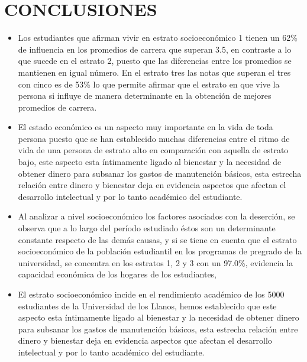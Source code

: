 
\section{CONCLUSIONES}

\begin{itemize}
 	
 	\item Los estudiantes que afirman vivir en estrato socioeconómico 1 tienen un 62\% de influencia en los promedios de carrera que superan 3.5, en contraste a lo que sucede en el estrato 2, puesto que las diferencias entre los promedios se mantienen en igual número. En el estrato tres las notas que superan el tres con cinco es de 53\% lo que permite afirmar que el estrato  en que vive la persona si influye de manera determinante en la obtención de mejores promedios de carrera.
 	
 	\item El estado económico es un aspecto muy importante en la vida de toda persona puesto que se han establecido muchas diferencias entre el ritmo de vida de una persona de estrato alto en comparación con aquella de estrato bajo, este aspecto esta íntimamente ligado al bienestar y la necesidad de obtener dinero para subsanar los gastos de manutención básicos, esta estrecha relación entre dinero y bienestar deja en evidencia aspectos que afectan el desarrollo intelectual y por lo tanto académico del estudiante.
 	
 	\item Al analizar a nivel socioeconómico los factores asociados con la deserción, se observa que a lo largo del período estudiado éstos son un determinante constante respecto de las demás causas, y si se tiene en cuenta que el estrato socioeconómico de la población estudiantil en los programas de pregrado de la universidad, se concentra en los estratos 1, 2 y 3 con un 97.0\%, evidencia la  capacidad económica de los hogares de los estudiantes,
 	
 	\item El estrato socioeconómico incide en el rendimiento académico de los 5000 estudiantes de la Universidad de los Llanos, hemos establecido que este aspecto esta íntimamente ligado al bienestar y la necesidad de obtener dinero para subsanar los gastos de manutención básicos, esta estrecha relación entre dinero y bienestar deja en evidencia aspectos que afectan el desarrollo intelectual y por lo tanto académico del estudiante. 
\end{itemize}
